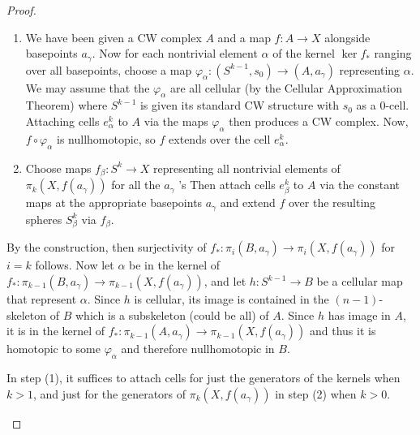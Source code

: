 \begin{proof}
    \begin{enumerate}
        \item We have been given
            a CW complex $A$ and a map
            $f \colon A \to X$ alongside basepoints
            $a_{\gamma}$. Now for each
            nontrivial element $\alpha$ of the kernel
            $\ker f_*$ ranging over
            all basepoints, choose
            a map $\varphi_{\alpha}\colon
            \left( S^{k-1}, s_0 \right) \to 
            \left( A, a_{\gamma} \right) $ representing
            $\alpha$. We may assume that the
            $\varphi_{\alpha}$ are all cellular (by
            the Cellular Approximation Theorem) where
            $S^{k-1}$ is given its standard CW structure
            with $s_0$ as a 0-cell. 
            Attaching cells $e_{\alpha}^{k}$ to $A$ via
            the maps $\varphi_{\alpha}$ then produces
            a CW complex. Now, $f \circ \varphi_{\alpha}$ 
            is nullhomotopic, so
            $f$ extends over the cell
            $e_{\alpha}^{k}$.
        \item Choose maps
            $f_{\beta}\colon S^{k}\to X$ representing
            all nontrivial elements of
            $\pi_k \left( X, f(a_{\gamma}) \right) $ for
            all the $a_{\gamma}$ 's Then attach
            cells $e_{\beta}^{k}$ to $A$ via the
            constant maps at the appropriate basepoints
            $a_{\gamma}$ and extend $f$ over the resulting spheres
            $S_{\beta}^{k}$ via $f_{\beta}$.
    \end{enumerate}
    By the construction, then
    surjectivity of
    $f_* \colon \pi_i \left( B, a_{\gamma} \right) 
    \to \pi_i \left( X, f(a_{\gamma}) \right) $ for
    $i = k$ follows. Now
    let $\alpha$ be in the kernel of
    $f_* \colon \pi_{k-1} (B, a_{\gamma}) \to 
    \pi_{k-1}\left( X, f(a_{\gamma}) \right) $, and
    let $h \colon S^{k-1} \to B$ be a cellular
    map that represent $\alpha$. Since
    $h$ is cellular, its image is contained in the
     $\left( n-1 \right) $-skeleton
     of $B$ which is a subskeleton (could be all) of $A$.
     Since $h$ has image in $A$, it is in the kernel
     of $f_* \colon \pi_{k-1}(A, a_{\gamma}) \to 
     \pi_{k-1} \left( X, f(a_{\gamma}) \right) $ and thus
     it is homotopic to some $\varphi_{\alpha}$ and therefore
     nullhomotopic in $B$.\\
     \begin{note}
         In step (1), it suffices to attach cells for
         just the generators of the kernels
         when $k>1$, and just for the generators
         of $\pi_k \left( X, f(a_{\gamma}) \right) $ in
         step (2) when $k>0$.
     \end{note}


\end{proof}
